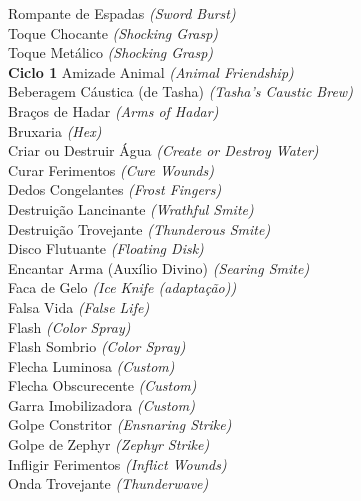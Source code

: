\documentclass{RPG_Adventure}[2021/10/20]
\begin{document}
{\normalsize Rompante de Espadas \textit{(Sword Burst)}\\ }
{\normalsize Toque Chocante \textit{(Shocking Grasp)}\\ }
{\normalsize Toque Metálico \textit{(Shocking Grasp)}\\ }
\jump\noindent\textbf{Ciclo 1}
{\normalsize Amizade Animal \textit{(Animal Friendship)}\\ }
{\normalsize Beberagem Cáustica (de Tasha) \textit{(Tasha's Caustic Brew)}\\ }
{\normalsize Braços de Hadar \textit{(Arms of Hadar)}\\ }
{\normalsize Bruxaria \textit{(Hex)}\\ }
{\normalsize Criar ou Destruir Água \textit{(Create or Destroy Water)}\\ }
{\normalsize Curar Ferimentos \textit{(Cure Wounds)}\\ }
{\normalsize Dedos Congelantes \textit{(Frost Fingers)}\\ }
{\normalsize Destruição Lancinante \textit{(Wrathful Smite)}\\ }
{\normalsize Destruição Trovejante \textit{(Thunderous Smite)}\\ }
{\normalsize Disco Flutuante \textit{(Floating Disk)}\\ }
{\normalsize Encantar Arma (Auxílio Divino) \textit{(Searing Smite)}\\ }
{\normalsize Faca de Gelo \textit{(Ice Knife (adaptação))}\\ }
{\normalsize Falsa Vida \textit{(False Life)}\\ }
{\normalsize Flash \textit{(Color Spray)}\\ }
{\normalsize Flash Sombrio \textit{(Color Spray)}\\ }
{\normalsize Flecha Luminosa \textit{(Custom)}\\ }
{\normalsize Flecha Obscurecente \textit{(Custom)}\\ }
{\normalsize Garra Imobilizadora \textit{(Custom)}\\ }
{\normalsize Golpe Constritor \textit{(Ensnaring Strike)}\\ }
{\normalsize Golpe de Zephyr \textit{(Zephyr Strike)}\\ }
{\normalsize Infligir Ferimentos \textit{(Inflict Wounds)}\\ }
{\normalsize Onda Trovejante \textit{(Thunderwave)}\\ }
\end{document}
